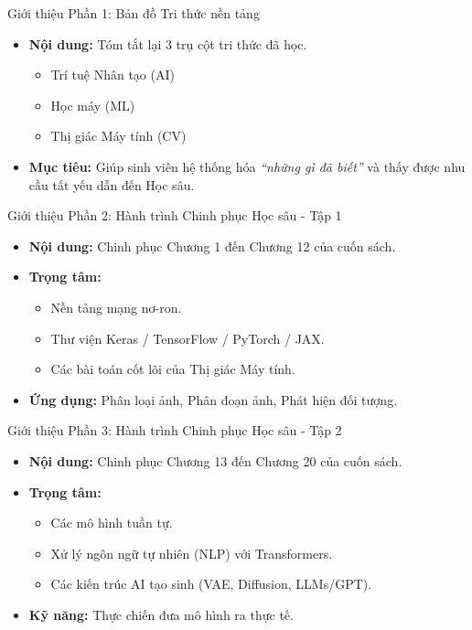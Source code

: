 \documentclass[aspectratio=169]{beamer}
\begin{document}
\begin{frame}{Giới thiệu Phần 1: Bản đồ Tri thức nền tảng}
    \begin{itemize}
        \item \textbf{Nội dung:} Tóm tắt lại 3 trụ cột tri thức đã học.
        \begin{itemize}
            \item Trí tuệ Nhân tạo (AI)
            \item Học máy (ML)
            \item Thị giác Máy tính (CV)
        \end{itemize}
        \item \textbf{Mục tiêu:} Giúp sinh viên hệ thống hóa \textit{“những gì đã biết”} và thấy được nhu cầu tất yếu dẫn đến Học sâu.
    \end{itemize}
\end{frame}

\begin{frame}{Giới thiệu Phần 2: Hành trình Chinh phục Học sâu - Tập 1}
    \begin{itemize}
        \item \textbf{Nội dung:} Chinh phục Chương 1 đến Chương 12 của cuốn sách.
        \item \textbf{Trọng tâm:}
        \begin{itemize}
            \item Nền tảng mạng nơ-ron.
            \item Thư viện Keras / TensorFlow / PyTorch / JAX.
            \item Các bài toán cốt lõi của Thị giác Máy tính.
        \end{itemize}
        \item \textbf{Ứng dụng:} Phân loại ảnh, Phân đoạn ảnh, Phát hiện đối tượng.
    \end{itemize}
\end{frame}

\begin{frame}{Giới thiệu Phần 3: Hành trình Chinh phục Học sâu - Tập 2}
    \begin{itemize}
        \item \textbf{Nội dung:} Chinh phục Chương 13 đến Chương 20 của cuốn sách.
        \item \textbf{Trọng tâm:}
        \begin{itemize}
            \item Các mô hình tuần tự.
            \item Xử lý ngôn ngữ tự nhiên (NLP) với Transformers.
            \item Các kiến trúc AI tạo sinh (VAE, Diffusion, LLMs/GPT).
        \end{itemize}
        \item \textbf{Kỹ năng:} Thực chiến đưa mô hình ra thực tế.
    \end{itemize}
\end{frame}
\end{document}

